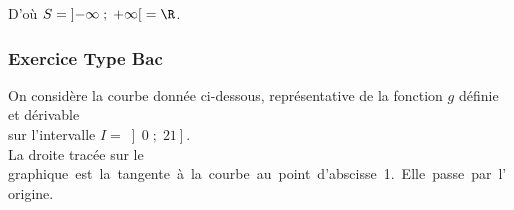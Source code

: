 D'où $S = \left]-\infty \; ; \; +\infty\right[ = \R$.

\vspace*{-5cm}

\newpage

\vspace*{-2cm}

\subsubsection{Exercice Type Bac }

On considère la courbe donnée ci-dessous, représentative de la fonction $g$ définie et dérivable \\ sur l'intervalle $I = \left] 0 \; ; \; 21 \right]$. \\

La droite tracée sur le \hbox{graphique est la tangente à la courbe au point d'abscisse 1. Elle passe par l'origine.} \\

